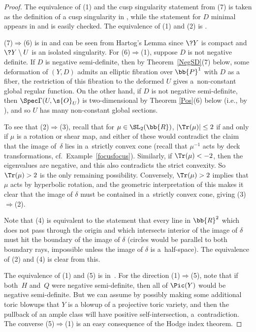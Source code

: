 \begin{proof}The equivalence of (1) and the cusp singularity statement from (7) is taken as the definition of a cusp singularity in \cite{GHK1}, while the statement for $D$ minimal appears in \cite[Example~1.10]{GHK1} and is easily checked. The equivalence of (1) and (2) is \cite[Lemma~1.5, arXiv v1]{GHK1}.

(7)$\Rightarrow$(6) is in \cite{GHK2} and can be seen from Hartog's Lemma since $\?{Y}$ is compact and $\?{Y}\setminus U$ is an isolated singularity. For (6)$\Rightarrow$(1), suppose $D$ is not negative definite. If $D$ is negative semi-definite, then by Theorem~\ref{NegSD}(7) below, some deformation of $(Y,D)$ admits an elliptic fibration over $\bb{P}^1$ with $D$ as a fiber, the restriction of this fibration to the deformed $U$ gives a~non-constant global regular function. On the other hand, if $D$ is not negative semi-definite, then $\Spec \Gamma(U,\s{O}_U)$ is two-dimensional by Theorem \ref{Pos}(6) below (i.e., by \cite[Lemma~6.9]{GHK1}), and so $U$ has many non-constant global sections.

To see that (2)$\Rightarrow$(3), recall that for $\mu \in \SL_2(\bb{R})$, $|\Tr(\mu)|\leq 2$ if and only if $\mu$ is a rotation or shear map, and either of these would contradict the claim that the image of~$\delta$ lies in a~strictly convex cone (recall that $\mu^{-1}$ acts by deck transformations, cf.\ Example~\ref{focusfocus}). Similarly, if \mbox{$\Tr(\mu)<-2$}, then the eigenvalues are negative, and this also contradicts the strict convexity. So $\Tr(\mu)>2$ is the only remaining possibility. Conversely, $\Tr(\mu)>2$ implies that $\mu$ acts by hyperbolic rotation, and the geometric interpretation of this makes it clear that the image of $\delta$ must be contained in a~strictly convex cone, giving (3)$\Rightarrow$(2).

Note that (4) is equivalent to the statement that every line in $\bb{R}^2$ which does not pass through the origin and which intersects interior of the image of $\delta$ must hit the boundary of the image of $\delta$ (circles would be parallel to both boundary rays, impossible unless the image of $\delta$ is a~half-space). The equivalence of (2) and (4) is clear from this.

The equivalence of (1) and (5) is in~\cite{GHK2}. For the direction (1)$\Rightarrow$(5), note that if both~$H$ and~$Q$ were negative semi-definite, then all of $\Pic(Y)$ would be negative semi-definite. But we can assume by possibly making some additional toric blowups that $Y$ is a blowup of a projective toric variety, and then the pullback of an ample class will have positive self-intersection, a~contradiction. The converse (5)$\Rightarrow$(1) is an easy consequence of the Hodge index theorem.
\end{proof}


